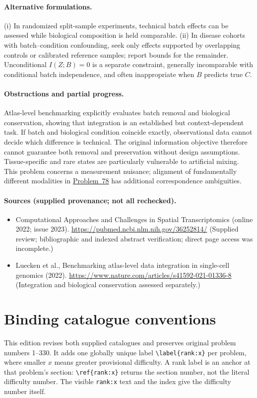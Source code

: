 \documentclass[11pt]{article}
\begin{document}
\paragraph{Alternative formulations.} (i) In randomized split-sample experiments, technical batch effects can be assessed while biological composition is held comparable. (ii) In disease cohorts with batch--condition confounding, seek only effects supported by overlapping controls or calibrated reference samples; report bounds for the remainder. Unconditional $I(Z;B)=0$ is a separate constraint, generally incomparable with conditional batch independence, and often inappropriate when $B$ predicts true $C$.
\paragraph{Obstructions and partial progress.} Atlas-level benchmarking explicitly evaluates batch removal and biological conservation, showing that integration is an established but context-dependent task. If batch and biological condition coincide exactly, observational data cannot decide which difference is technical. The original information objective therefore cannot guarantee both removal and preservation without design assumptions. Tissue-specific and rare states are particularly vulnerable to artificial mixing. This problem concerns a measurement nuisance; alignment of fundamentally different modalities in \href{https://we-solve.github.io/problems/cross-modal-biological-alignment-ea4a0eab/}{Problem~78} has additional correspondence ambiguities.
\paragraph{Sources (supplied provenance; not all rechecked).}
\begin{itemize}
\item Computational Approaches and Challenges in Spatial Transcriptomics (online 2022; issue 2023). \url{https://pubmed.ncbi.nlm.nih.gov/36252814/} (Supplied review; bibliographic and indexed abstract verification; direct page access was incomplete.)
\item Luecken et al., Benchmarking atlas-level data integration in single-cell genomics (2022). \url{https://www.nature.com/articles/s41592-021-01336-8} (Integration and biological conservation assessed separately.)
\end{itemize}


\section*{Binding catalogue conventions}
This edition revises both supplied catalogues and preserves original problem numbers 1--330. It adds one globally unique label \verb|\label{rank:x}| per problem, where smaller $x$ means greater provisional difficulty. A rank label is an anchor at that problem's section: \verb|\ref{rank:x}| returns the section number, not the literal difficulty number. The visible \texttt{rank:x} text and the index give the difficulty number itself.
\end{document}

